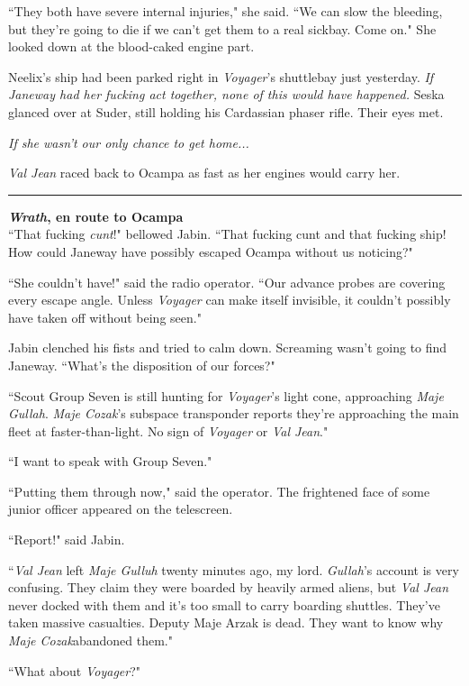 \documentclass[twoside,letterpaper,12pt]{memoir}
\begin{document}
``They both have severe internal injuries," she said. ``We can slow the bleeding, but they're going to die if we can't get them to a real sickbay. Come on." She looked down at the blood-caked engine part.

Neelix's ship had been parked right in \textit{Voyager}'s shuttlebay just yesterday. \textit{If Janeway had her fucking act together, none of this would have happened.} Seska glanced over at Suder, still holding his Cardassian phaser rifle. Their eyes met.

\textit{If she wasn't our only chance to get home...}

\textit{Val Jean} raced back to Ocampa as fast as her engines would carry her.

\fancybreak{\rule{3cm}{0.4 pt}}
\noindent\textbf{\textit{Wrath}, en route to Ocampa}\\

``That fucking \textit{cunt}!" bellowed Jabin. ``That fucking cunt and that fucking ship! How could Janeway have possibly escaped Ocampa without us noticing?"

``She couldn't have!" said the radio operator. ``Our advance probes are covering every escape angle. Unless \textit{Voyager} can make itself invisible, it couldn't possibly have taken off without being seen."

Jabin clenched his fists and tried to calm down. Screaming wasn't going to find Janeway. ``What's the disposition of our forces?"

``Scout Group Seven is still hunting for \textit{Voyager}'s light cone, approaching \textit{Maje Gullah}. \textit{Maje Cozak}'s subspace transponder reports they're approaching the main fleet at faster-than-light. No sign of \textit{Voyager} or \textit{Val Jean}."

``I want to speak with Group Seven."

``Putting them through now," said the operator. The frightened face of some junior officer appeared on the telescreen.

``Report!" said Jabin.

``\textit{Val Jean} left \textit{Maje Gulluh} twenty minutes ago, my lord. \textit{Gullah}'s account is very confusing. They claim they were boarded by heavily armed aliens, but \textit{Val Jean} never docked with them and it's too small to carry boarding shuttles. They've taken massive casualties. Deputy Maje Arzak is dead. They want to know why \textit{Maje Cozak}abandoned them."

``What about \textit{Voyager}?"
\end{document}
